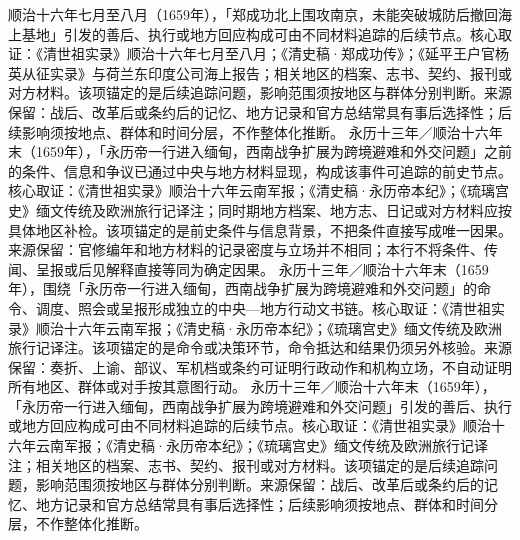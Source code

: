 顺治十六年七月至八月（1659年），「郑成功北上围攻南京，未能突破城防后撤回海上基地」引发的善后、执行或地方回应构成可由不同材料追踪的后续节点。核心取证：《清世祖实录》顺治十六年七月至八月；《清史稿·郑成功传》；《延平王户官杨英从征实录》与荷兰东印度公司海上报告；相关地区的档案、志书、契约、报刊或对方材料。该项锚定的是后续追踪问题，影响范围须按地区与群体分别判断。来源保留：战后、改革后或条约后的记忆、地方记录和官方总结常具有事后选择性；后续影响须按地点、群体和时间分层，不作整体化推断。
永历十三年／顺治十六年末（1659年），「永历帝一行进入缅甸，西南战争扩展为跨境避难和外交问题」之前的条件、信息和争议已通过中央与地方材料显现，构成该事件可追踪的前史节点。核心取证：《清世祖实录》顺治十六年云南军报；《清史稿·永历帝本纪》；《琉璃宫史》缅文传统及欧洲旅行记译注；同时期地方档案、地方志、日记或对方材料应按具体地区补检。该项锚定的是前史条件与信息背景，不把条件直接写成唯一因果。来源保留：官修编年和地方材料的记录密度与立场并不相同；本行不将条件、传闻、呈报或后见解释直接等同为确定因果。
永历十三年／顺治十六年末（1659年），围绕「永历帝一行进入缅甸，西南战争扩展为跨境避难和外交问题」的命令、调度、照会或呈报形成独立的中央—地方行动文书链。核心取证：《清世祖实录》顺治十六年云南军报；《清史稿·永历帝本纪》；《琉璃宫史》缅文传统及欧洲旅行记译注。该项锚定的是命令或决策环节，命令抵达和结果仍须另外核验。来源保留：奏折、上谕、部议、军机档或条约可证明行政动作和机构立场，不自动证明所有地区、群体或对手按其意图行动。
永历十三年／顺治十六年末（1659年），「永历帝一行进入缅甸，西南战争扩展为跨境避难和外交问题」引发的善后、执行或地方回应构成可由不同材料追踪的后续节点。核心取证：《清世祖实录》顺治十六年云南军报；《清史稿·永历帝本纪》；《琉璃宫史》缅文传统及欧洲旅行记译注；相关地区的档案、志书、契约、报刊或对方材料。该项锚定的是后续追踪问题，影响范围须按地区与群体分别判断。来源保留：战后、改革后或条约后的记忆、地方记录和官方总结常具有事后选择性；后续影响须按地点、群体和时间分层，不作整体化推断。
